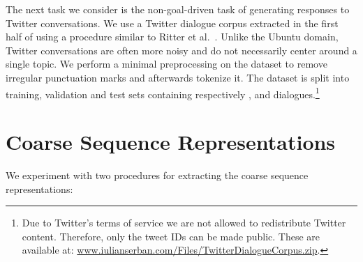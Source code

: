 \documentclass{article}
\begin{document}
The next task we consider is the non-goal-driven task of generating responses to Twitter conversations.
We use a Twitter dialogue corpus extracted in the first half of  using a procedure similar to Ritter et al.~\cite{ritter2011data}.
Unlike the Ubuntu domain,
Twitter conversations are often more noisy and do not necessarily center around a single topic.
We perform a minimal preprocessing on the dataset to remove irregular punctuation marks and afterwards tokenize it.
The dataset is split into training, validation and test sets
containing respectively ,  and  dialogues.\footnote{Due to Twitter's terms of service we are not allowed to redistribute Twitter content. Therefore, only the tweet IDs can be made public. These are available at: \url{www.iulianserban.com/Files/TwitterDialogueCorpus.zip}.}


 
\section{Coarse Sequence Representations} \label{seq:coarse_seq_rep}
We experiment with two procedures for extracting the coarse sequence representations:
\end{document}
